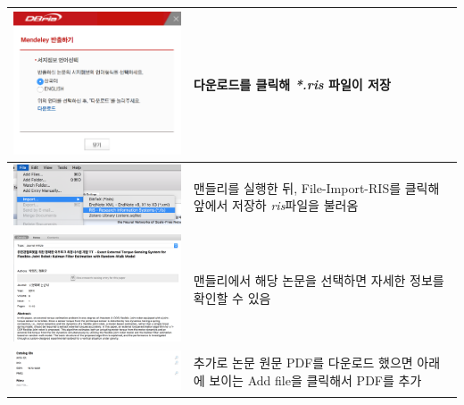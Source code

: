 \documentclass[11pt]{article}
\begin{document}
\begin{tabular}{ m{11cm} m{50mm} }
	\hline
	\includegraphics[width=7cm]{./image/ris_import4.png} & \textrm{다운로드}를 클릭해 \textit{*.ris} 파일이 저장\\
	\hline
	\includegraphics[width=10cm]{./image/ris_import5.png} & 맨들리를 실행한 뒤,  \textrm{File-Import-RIS}를 클릭해 앞에서 저장하 \textit{ris}파일을 불러옴 \\
	\hline
	\includegraphics[width=10cm]{./image/ris_import7.png} & 맨들리에서 해당 논문을 선택하면 자세한 정보를 확인할 수 있음 \\
	\hline
	\includegraphics[width=10cm]{./image/ris_import8.png} & 추가로 논문 원문 PDF를 다운로드 했으면 아래에 보이는 \textrm{Add file}을 클릭해서 PDF를 추가\\
\end{tabular}
\end{document}
